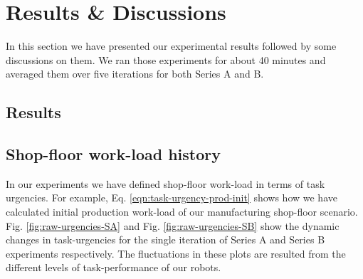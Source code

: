 \documentclass[smallcondensed]{svjour3}
\begin{document}
\section{Results \& Discussions}
\label{sec:res}
In this section we have presented our experimental results followed by some discussions on them. We ran those experiments for about 40 minutes and averaged them over five iterations for both Series A and B.
\subsection{Results}
\subsection*{Shop-floor work-load history}
In our experiments we have defined shop-floor work-load in terms of task urgencies. For example, Eq. \ref{eqn:task-urgency-prod-init} shows how we have calculated initial production work-load of our manufacturing shop-floor scenario. Fig. \ref{fig:raw-urgencies-SA} and Fig. \ref{fig:raw-urgencies-SB}  show the dynamic changes in task-urgencies for the single iteration of Series A and Series B experiments respectively. The fluctuations in these plots are resulted from the different levels of task-performance of our robots.
\end{document}
